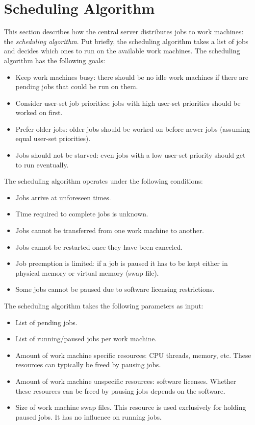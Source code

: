 \chapter{Scheduling Algorithm}
This section describes how the central server distributes jobs to work machines: the \textit{scheduling algorithm}.
Put briefly, the scheduling algorithm takes a list of jobs and decides which ones to run on the available work machines.
The scheduling algorithm has the following goals:
\begin{itemize}
  \item Keep work machines busy: there should be no idle work machines if there are pending jobs that could be run on them.
  \item Consider user-set job priorities: jobs with high user-set priorities should be worked on first.
  \item Prefer older jobs: older jobs should be worked on before newer jobs (assuming equal user-set priorities).
  \item Jobs should not be starved: even jobs with a low user-set priority should get to run eventually.
\end{itemize}
The scheduling algorithm operates under the following conditions:
\begin{itemize}
  \item Jobs arrive at unforeseen times.
  \item Time required to complete jobs is unknown.
  \item Jobs cannot be transferred from one work machine to another.
  \item Jobs cannot be restarted once they have been canceled.
  \item Job preemption is limited: if a job is paused it has to be kept either in physical memory or virtual memory (swap file).
  \item Some jobs cannot be paused due to software licensing restrictions.
\end{itemize}
The scheduling algorithm takes the following parameters as input:
\begin{itemize}
  \item List of pending jobs.
  \item List of running/paused jobs per work machine.
  \item Amount of work machine specific resources: CPU threads, memory, etc.
  These resources can typically be freed by pausing jobs.
  \item Amount of work machine unspecific resources: software licenses.
  Whether these resources can be freed by pausing jobs depends on the software.
  \item Size of work machine swap files.
  This resource is used exclusively for holding paused jobs.
  It has no influence on running jobs.
\end{itemize}
